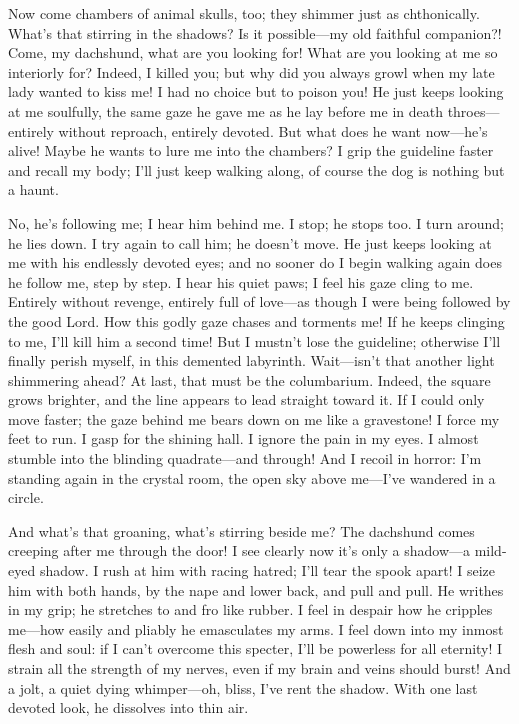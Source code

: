 \documentclass[12pt,a4paper]{article}
\begin{document}
Now come chambers of animal skulls, too; they shimmer just as chthonically. What’s that stirring in the shadows? Is it possible—my old faithful companion?! Come, my dachshund, what are you looking for! What are you looking at me so interiorly for? Indeed, I killed you; but why did you always growl when my late lady wanted to kiss me! I had no choice but to poison you! He just keeps looking at me soulfully, the same gaze he gave me as he lay before me in death throes—entirely without reproach, entirely devoted. But what does he want now—he’s alive! Maybe he wants to lure me into the chambers? I grip the guideline faster and recall my body; I’ll just keep walking along, of course the dog is nothing but a haunt.

No, he’s following me; I hear him behind me. I stop; he stops too. I turn around; he lies down. I try again to call him; he doesn’t move. He just keeps looking at me with his endlessly devoted eyes; and no sooner do I begin walking again does he follow me, step by step. I hear his quiet paws; I feel his gaze cling to me. Entirely without revenge, entirely full of love—as though I were being followed by the good Lord. How this godly gaze chases and torments me! If he keeps clinging to me, I’ll kill him a second time! But I mustn’t lose the guideline; otherwise I’ll finally perish myself, in this demented labyrinth. Wait—isn’t that another light shimmering ahead? At last, that must be the columbarium. Indeed, the square grows brighter, and the line appears to lead straight toward it. If I could only move faster; the gaze behind me bears down on me like a gravestone! I force my feet to run. I gasp for the shining hall. I ignore the pain in my eyes. I almost stumble into the blinding quadrate—and through! And I recoil in horror: I’m standing again in the crystal room, the open sky above me—I’ve wandered in a circle.

And what’s that groaning, what’s stirring beside me? The dachshund comes creeping after me through the door! I see clearly now it’s only a shadow—a mild-eyed shadow. I rush at him with racing hatred; I’ll tear the spook apart! I seize him with both hands, by the nape and lower back, and pull and pull. He writhes in my grip; he stretches to and fro like rubber. I feel in despair how he cripples me—how easily and pliably he emasculates my arms. I feel down into my inmost flesh and soul: if I can’t overcome this specter, I’ll be powerless for all eternity! I strain all the strength of my nerves, even if my brain and veins should burst! And a jolt, a quiet dying whimper—oh, bliss, I’ve rent the shadow. With one last devoted look, he dissolves into thin air.
\end{document}
